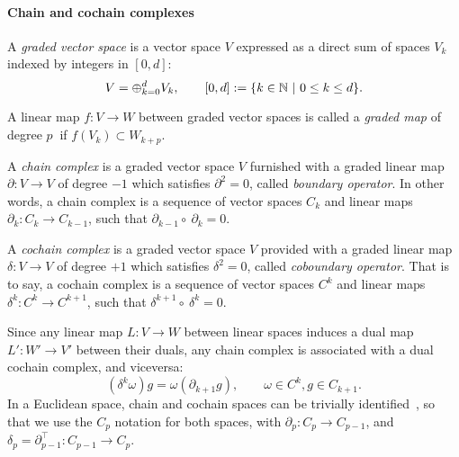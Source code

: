 \paragraph{Chain and cochain complexes}\label{graded-complexes}
%
A \emph{graded vector space} is a vector space $V$ expressed as a direct sum  of
spaces $V_k$ indexed by integers in $[0,d]$:
\[ V = \oplus_{k = 0}^d V_k, \qquad [0,d] := \{k\in\mathbb{N} \ |\ 0\leq k\leq d\}.
\]

A linear map $f:V\to W$ between graded vector spaces is called a \emph{graded
map} of degree $p\ $ if $f(V_k) \subset W_{k+p}$.

A \emph{chain complex} is a graded vector  space $V$ furnished with a graded
linear map $\partial : V \to V$ of degree $-1$ which satisfies $\partial^2 = 0$, called
\emph{boundary operator}. In other words, a chain complex
is a sequence of vector spaces $C_k$ and linear maps $\partial_k : C_k \to C_{k-1}$,
such that $\partial_{k-1} \circ\ \partial_{k} = 0$.

A \emph{cochain complex} is a graded vector space $V$ provided with a graded
linear map $\delta : V \to V$ of degree $+1$ which satisfies $\delta^2 = 0$,
called \emph{coboundary operator}. That is to say, a cochain complex is a
sequence of vector spaces $C^k$ and linear maps $\delta^k : C^k \to C^{k+1}$,
such that $\delta^{k+1} \circ\ \delta^{k} = 0$.

Since any linear map $L: V\to W$ between linear spaces induces a dual map $L': 
W' \to V'$ between their duals, any chain complex is associated with a dual 
cochain complex, and viceversa:
\[
(\delta^k \omega) g = \omega (\partial_{k+1} g), \qquad \omega \in C^k, g \in C_{k+1}.
\]
 In a Euclidean space, chain and cochain spaces can be trivially identified~\cite{ieee-tase}, so that we use the $C_p$ notation for both spaces, with $\partial_p: C_p\to C_{p-1}$, and $\delta_p = \partial_{p-1}^\top: C_{p-1}\to C_p$.

